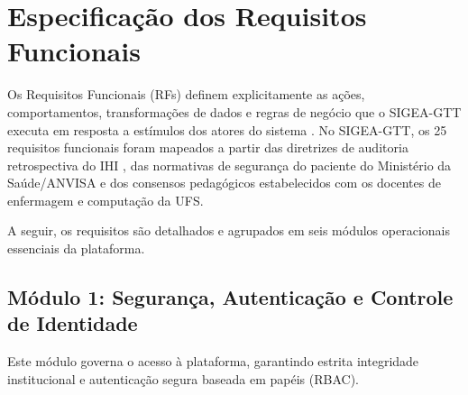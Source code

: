 \chapter{Especificação dos Requisitos Funcionais}
\label{cap_requisitos_funcionais}

Os Requisitos Funcionais (RFs) definem explicitamente as ações, comportamentos, transformações de dados e regras de negócio que o SIGEA-GTT executa em resposta a estímulos dos atores do sistema \cite{sommerville2019,wiegers2013}. No SIGEA-GTT, os 25 requisitos funcionais foram mapeados a partir das diretrizes de auditoria retrospectiva do IHI \cite{griffin2009ihi}, das normativas de segurança do paciente do Ministério da Saúde/ANVISA \cite{anvisa2017} e dos consensos pedagógicos estabelecidos com os docentes de enfermagem e computação da UFS.

A seguir, os requisitos são detalhados e agrupados em seis módulos operacionais essenciais da plataforma.

\section{Módulo 1: Segurança, Autenticação e Controle de Identidade}
\label{sec_mod1_auth}

Este módulo governa o acesso à plataforma, garantindo estrita integridade institucional e autenticação segura baseada em papéis (RBAC).

